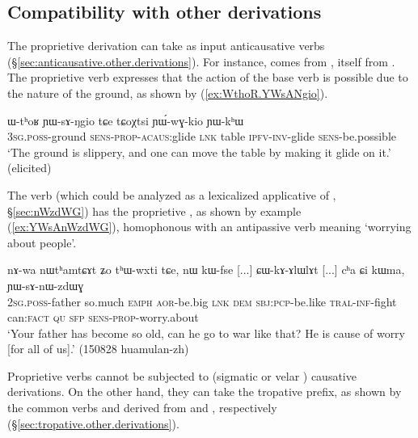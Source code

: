 \subsection{Compatibility with other derivations} \label{sec:proprietive.compatibility}
The proprietive derivation can take as input anticausative verbs (§\ref{sec:anticausative.other.derivations}). For instance,   comes from  , itself from . The proprietive verb  expresses that the action of the base verb  is possible due to the nature of the ground, as shown by (\ref{ex:WthoR.YWsANgio}).


\begin{exe}
\ex \label{ex:WthoR.YWsANgio}
\gll ɯ-tʰoʁ ɲɯ-sɤ-ŋgio tɕe tɕoχtsi ɲɯ́-wɣ-kio ɲɯ-kʰɯ \\
\textsc{3sg}.\textsc{poss}-ground \textsc{sens}-\textsc{prop}-\textsc{acaus}:glide \textsc{lnk} table \textsc{ipfv}-\textsc{inv}-glide \textsc{sens}-be.possible \\
\glt `The ground is slippery, and one can move the table by making it glide on it.' (elicited)
\end{exe}
 
The verb  (which could be analyzed as a lexicalized applicative of , §\ref{sec:nWzdWG}) has the  proprietive , as shown by example (\ref{ex:YWsAnWzdWG}), homophonous with an antipassive verb meaning `worrying about people'.

\begin{exe}
\ex \label{ex:YWsAnWzdWG}
\gll nɤ-wa nɯtʰamtɕɤt ʑo tʰɯ-wxti tɕe, nɯ kɯ-fse [...] ɕɯ-kɤ-ɤlɯlɤt  [...] cʰa ɕi kɯma, ɲɯ-sɤ-nɯ-zdɯɣ\\
\textsc{2sg}.\textsc{poss}-father so.much \textsc{emph} \textsc{aor}-be.big \textsc{lnk} \textsc{dem} \textsc{sbj}:\textsc{pcp}-be.like { } \textsc{tral}-\textsc{inf}-fight { } can:\textsc{fact} \textsc{qu} \textsc{sfp} \textsc{sens}-\textsc{prop}-worry.about\\
\glt `Your father has become so old, can he go to war like that? He is cause of worry [for all of us].' (150828 huamulan-zh) 
\end{exe}

Proprietive verbs cannot be subjected to (sigmatic  or velar ) causative derivations. On the other hand, they can take the tropative  prefix, as shown by the common verbs  and  derived from  and , respectively (§\ref{sec:tropative.other.derivations}).

